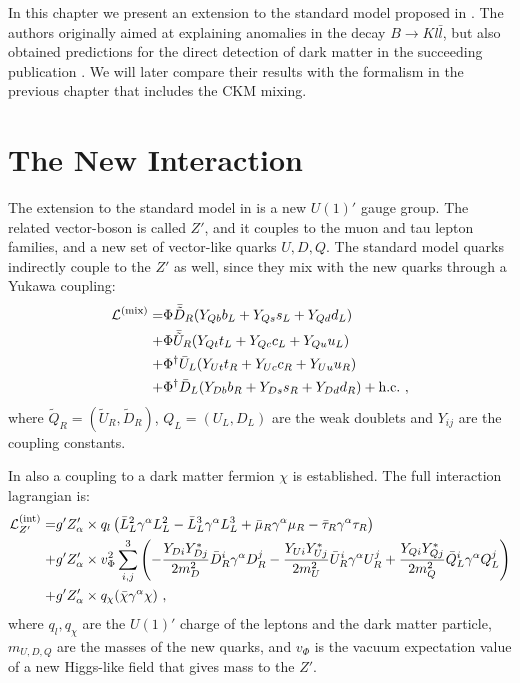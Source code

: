 In this chapter we present an extension to the standard model proposed in \cite{InColour}. The authors originally aimed at explaining anomalies in the decay $B\rightarrow Kl\bar{l}$, but also obtained predictions for the direct detection of dark matter in the succeeding publication \cite{Z}. We will later compare their results with the formalism in the previous chapter that includes the CKM mixing.

\section{The New Interaction}
The extension to the standard model in \cite{InColour} is a new $U(1)'$ gauge group. The related vector-boson is called $Z'$, and it couples to the muon and tau lepton families, and a new set of vector-like quarks $U,D,Q$. The standard model quarks indirectly couple to the $Z'$ as well, since they mix with the new quarks through a Yukawa coupling:
\begin{align}
	\mathcal{L}^{(\text{mix})} = &\Phi \bar{\tilde{D}}_R(Y_{Qb}b_L + Y_{Qs}s_L + Y_{Qd}d_L)\notag \\
	+ &\Phi\bar{\tilde{U}}_R(Y_{Qt}t_L + Y_{Qc}c_L + Y_{Qu}u_L)\notag \\
	+ &\Phi^\dagger\bar{U}_L(Y_{Ut}t_R + Y_{Uc}c_R + Y_{Uu}u_R)\notag \\
	+ &\Phi^\dagger\bar{D}_L(Y_{Db}b_R + Y_{Ds}s_R + Y_{Dd}d_R) +\text{h.c.} \ ,
\end{align}
where $\tilde{Q}_R = (\tilde{U}_R,\tilde{D}_R)$, $Q_L = (U_L,D_L)$ are the weak doublets and $Y_{ij}$ are the coupling constants.


In \cite{Z} also a coupling to a dark matter fermion $\chi$ is established. The full interaction lagrangian is:
\begin{align}
	\mathcal{L}^{(\text{int})}_{Z'} = &g'Z_\alpha'\times q_l\left(\bar{L}_L^2\gamma^\alpha L_L^2 - \bar{L}_L^3\gamma^\alpha L_L^3 + \bar{\mu}_R\gamma^\alpha\mu_R-\bar{\tau}_R\gamma^\alpha\tau_R\right)\notag \\
	+&g'Z_\alpha'\times v_\Phi^2\sum_{i,j}^3\left(-\frac{Y_{Di}Y^*_{Dj}}{2m_D^2}\bar{D}_R^i\gamma^\alpha D_R^j - \frac{Y_{Ui}Y^*_{Uj}}{2m_U^2}\bar{U}_R^i\gamma^\alpha U_R^j + \frac{Y_{Qi}Y_{Qj}^*}{2m_Q^2}\bar{Q}_L^i\gamma^\alpha Q_L^j\right)\notag \\
	+&g'Z_\alpha'\times q_\chi(\bar{\chi}\gamma^\alpha\chi) \ ,
\end{align}
where $q_l,q_\chi$ are the $U(1)'$ charge of the leptons and the dark matter particle, $m_{U,D,Q}$ are the masses of the new quarks, and $v_\Phi$ is the vacuum expectation value of a new Higgs-like field that gives mass to the $Z'$.


